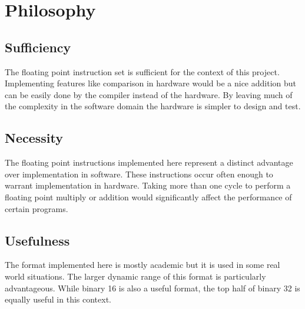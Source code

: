 \documentclass[conference]{IEEEtran}
\begin{document}
\section{Philosophy}
\subsection{Sufficiency}
The floating point instruction set is sufficient for the context of this
project. Implementing features like comparison in hardware would be a nice
addition but can be easily done by the compiler instead of the hardware. By
leaving much of the complexity in the software domain the hardware is simpler
to design and test.

\subsection{Necessity}
The floating point instructions implemented here represent a distinct advantage
over implementation in software. These instructions occur often enough to
warrant implementation in hardware. Taking more than one cycle to perform
a floating point multiply or addition would significantly affect the 
performance of certain programs.

\subsection{Usefulness}
The format implemented here is mostly academic but it is used in some real 
world situations. The larger dynamic range of this format is particularly 
advantageous. While binary 16 is also a useful format, the top half of binary 32
is equally useful in this context.



\end{document}
